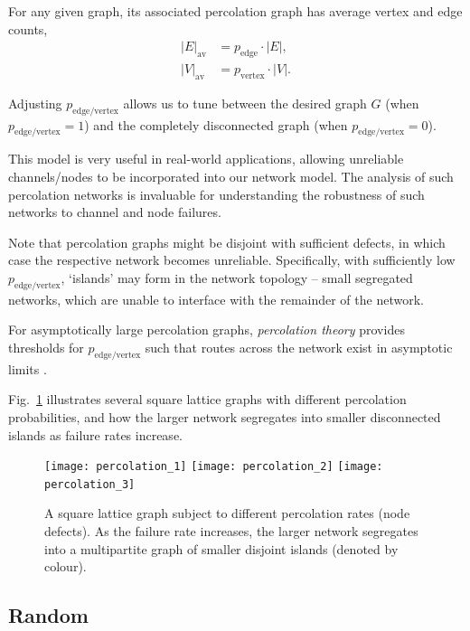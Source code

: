 For any given graph, its associated percolation graph has average vertex and edge counts,
\begin{align}
|E|_\mathrm{av} &= p_\mathrm{edge}\cdot |E|,\nonumber\\
|V|_\mathrm{av} &= p_\mathrm{vertex}\cdot |V|.
\end{align}

Adjusting $p_\mathrm{edge/vertex}$ allows us to tune between the desired graph $G$ (when $p_\mathrm{edge/vertex}=1$) and the completely disconnected graph (when $p_\mathrm{edge/vertex}=0$).

This model is very useful in real-world applications, allowing unreliable channels/nodes to be incorporated into our network model. The analysis of such percolation networks is invaluable for understanding the robustness of such networks to channel and node failures.

Note that percolation graphs might be disjoint with sufficient defects, in which case the respective network becomes unreliable. Specifically, with sufficiently low $p_\mathrm{edge/vertex}$, `islands' may form in the network topology -- small segregated networks, which are unable to interface with the remainder of the network.

For asymptotically large percolation graphs, \textit{percolation theory} \cite{???} provides thresholds for $p_\mathrm{edge/vertex}$ such that routes across the network exist in asymptotic limits \cite{???}.

Fig.~\ref{fig:perc_graph} illustrates several square lattice graphs with different percolation probabilities, and how the larger network segregates into smaller disconnected islands as failure rates increase.

\begin{figure}[!htbp]
\texttt{[image: percolation\_1]}
\texttt{[image: percolation\_2]}
\texttt{[image: percolation\_3]}
\caption{A square lattice graph subject to different percolation rates (node defects). As the failure rate increases, the larger network segregates into a multipartite graph of smaller disjoint islands (denoted by colour).} \label{fig:perc_graph}
\end{figure}

%
%

\subsection{Random}

